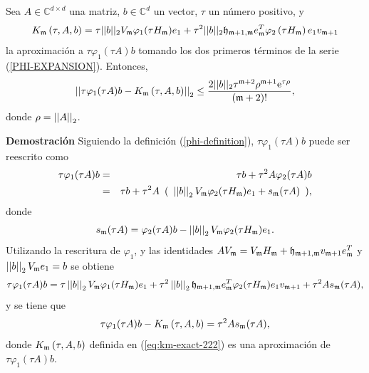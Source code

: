  \begin{lemma}\cite{naranjo2021locally}\label{lemma:CORRECTED-ERROR}
	Sea $A\in\mathbb{C}^{d\times d}$ una matriz, $b\in\mathbb{C}^{d}$ un vector, $\tau$ un número positivo, y 
	\begin{equation}
		{K_{\mathfrak{m}}\left(\tau,A , b \right) = \tau ||b||_2 V_{\mathfrak{m}}\varphi_1(\tau H_{\mathfrak{m}})e_1}+\tau^2 ||b||_2 \mathfrak{h}_{\mathfrak{m}+1,\mathfrak{m}}e_{\mathfrak{m}}^T\varphi_2\left(\tau H_{\mathfrak{m}}\right) e_1 v_{\mathfrak{m}+1} \label{eq:km-exact-222}
	\end{equation}
	 la aproximación a $\tau \varphi_1(\tau A)b$ tomando los dos primeros términos de la serie (\ref{PHI-EXPANSION}). Entonces,
	\begin{gather*}
	\left\lvert\left\lvert \tau\varphi_1(\tau A)b - K_{\mf}\left(\tau,A , b \right) \right\rvert\right\rvert_2%
	\leq \frac{2\vert\lvert b \rvert\rvert_2\tau^{\mf+2}\rho^{\mf+1}\me{\tau \rho}}{(\mf+2)!},
	\end{gather*}
	donde $\rho=\left\lvert \left\lvert A \right\rvert \right\rvert_2$.
\end{lemma}
\textbf{Demostración}
Siguiendo la definición (\ref{phi-definition}), $\tau \varphi_1(\tau A)b$ puede ser reescrito como
\begin{eqnarray*}
	\tau \varphi_1(\tau A)b &=& \tau b+\tau^{2}A\varphi_{2}(\tau A)b \\
	&=& \tau b+\tau^{2}A \,\ (\,\ \nnorm{\nnorm{b}}_2V_\mf\varphi_{2}(\tau H_\mf)e_1 +s_\mf(\tau A) \,\ ), %
\end{eqnarray*}
donde \[ s_{\mathfrak{m}} (\tau A)= \varphi_{2}(\tau A)b -\left\lvert \left\lvert b \right\rvert \right\rvert_2V_{\mathfrak{m}}\varphi_{2}(\tau H_{\mathfrak{m}})e_1 .\]
Utilizando la rescritura de $\varphi_1$, y las identidades $AV_{\mathfrak{m}}=V_{\mathfrak{m}} H_{\mathfrak{m}} + \mathfrak{h}_{\mathfrak{m}+1,\mathfrak{m}}v_{\mathfrak{m}+1}e^{T}_{\mathfrak{m}}$ y  $\left\lvert \left\lvert b \right\rvert \right\rvert_2V_{\mathfrak{m}} e_1=b$ se obtiene
\begin{equation}
\tau\varphi_1(\tau A)b = \tau\nnorm{\nnorm{b}}_2V_\mf\varphi_1(\tau H_\mf)e_1 + \tau^{2}\nnorm{\nnorm{b}}_2\hf_{\mf+1,\mf}e^T_\mf\varphi_{2}(\tau H_\mf)e_1v_{\mf+1}+\tau^{2}As_\mf (\tau A), %
\end{equation}
y se tiene que
\begin{equation}
\tau\varphi_1(\tau A)b - K_{\mathfrak{m}}\left(\tau,A , b \right) = \tau^{2}As_{\mathfrak{m}}(\tau A), \label{eq:phidiffasm}
\end{equation}
donde $K_{\mathfrak{m}}\left(\tau,A , b \right)$ definida en (\ref{eq:km-exact-222}) es una aproximación de $\tau \varphi_1(\tau A)b$.


